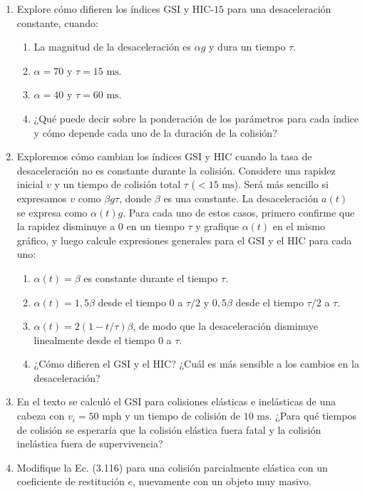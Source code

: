 \documentclass[12pt]{book}
\begin{document}
\begin{enumerate}
\item[3.134] Explore cómo difieren los índices $\text{GSI}$ y $\text{HIC-15}$ para una desaceleración constante, cuando:
\begin{enumerate}
\item[(a)] La magnitud de la desaceleración es $\alpha g$ y dura un tiempo $\tau$.
\item[(b)] $\alpha = 70$ y $\tau = 15\text{ ms}$.
\item[(c)] $\alpha = 40$ y $\tau = 60\text{ ms}$.
\item[(d)] ¿Qué puede decir sobre la ponderación de los parámetros para cada índice y cómo depende cada uno de la duración de la colisión?
\end{enumerate}

\item[3.135] Exploremos cómo cambian los índices $\text{GSI}$ y $\text{HIC}$ cuando la tasa de desaceleración no es constante durante la colisión. Considere una rapidez inicial $v$ y un tiempo de colisión total $\tau$ ($< 15\text{ ms}$). Será más sencillo si expresamos $v$ como $\beta g \tau$, donde $\beta$ es una constante. La desaceleración $a(t)$ se expresa como $\alpha(t)g$. Para cada uno de estos casos, primero confirme que la rapidez disminuye a $0$ en un tiempo $\tau$ y grafique $\alpha(t)$ en el mismo gráfico, y luego calcule expresiones generales para el $\text{GSI}$ y el $\text{HIC}$ para cada uno:
\begin{enumerate}
\item[(a)] $\alpha(t) = \beta$ es constante durante el tiempo $\tau$.
\item[(b)] $\alpha(t) = 1{,}5\beta$ desde el tiempo $0$ a $\tau/2$ y $0{,}5\beta$ desde el tiempo $\tau/2$ a $\tau$.
\item[(c)] $\alpha(t) = 2(1 - t/\tau)\beta$, de modo que la desaceleración disminuye linealmente desde el tiempo $0$ a $\tau$.
\item[(d)] ¿Cómo difieren el $\text{GSI}$ y el $\text{HIC}$? ¿Cuál es más sensible a los cambios en la desaceleración?
\end{enumerate}

\item[3.136] En el texto se calculó el $\text{GSI}$ para colisiones elásticas e inelásticas de una cabeza con $v_i = 50\text{ mph}$ y un tiempo de colisión de $10\text{ ms}$. ¿Para qué tiempos de colisión se esperaría que la colisión elástica fuera fatal y la colisión inelástica fuera de supervivencia?

\item[3.137] Modifique la Ec. (3.116) para una colisión parcialmente elástica con un coeficiente de restitución $e$, nuevamente con un objeto muy masivo.


\end{enumerate}
\end{document}
